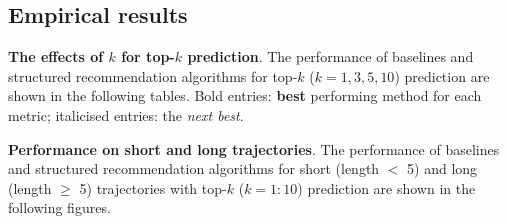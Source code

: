 
\clearpage
\subsection{Empirical results}

\textbf{The effects of $k$ for top-$k$ prediction}.
The performance of baselines and structured recommendation algorithms for top-$k$ ($k=1,3,5,10$) 
prediction are shown in the following tables.
Bold entries: \textbf{best} performing method for each metric; italicised entries: the \textit{next best}. 



\textbf{Performance on short and long trajectories}.
The performance of baselines and structured recommendation algorithms 
for short (length $<$ 5) and long (length $\ge$ 5) trajectories 
with top-$k$ ($k=1:10$) prediction are shown in the following figures.

%

